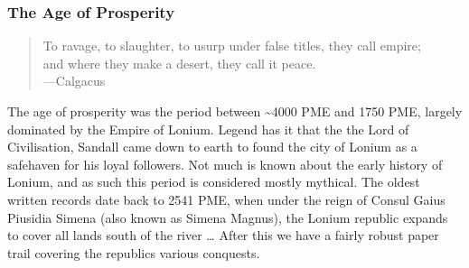 \documentclass[11pt]{article}
\begin{document}
\subsubsection{The Age of Prosperity}
\label{sec:org11638d5}
\begin{quote}
To ravage, to slaughter, to usurp under false titles, they call empire; \\
and where they make a desert, they call it peace. \\
---Calgacus
\end{quote}
The age of prosperity was the period between \textasciitilde{}4000 PME and 1750 PME, largely dominated by the Empire of Lonium. Legend has it that the the Lord of Civilisation, Sandall came down to earth to found the city of Lonium as a safehaven for his loyal followers. Not much is known about the early history of Lonium, and as such this period is considered mostly mythical. The oldest written records date back to 2541 PME, when under the reign of Consul Gaius Piusidia Simena (also known as Simena Magnus), the Lonium republic expands to cover all lands south of the river \ldots{} After this we have a fairly robust paper trail covering the republics various conquests.
\end{document}
